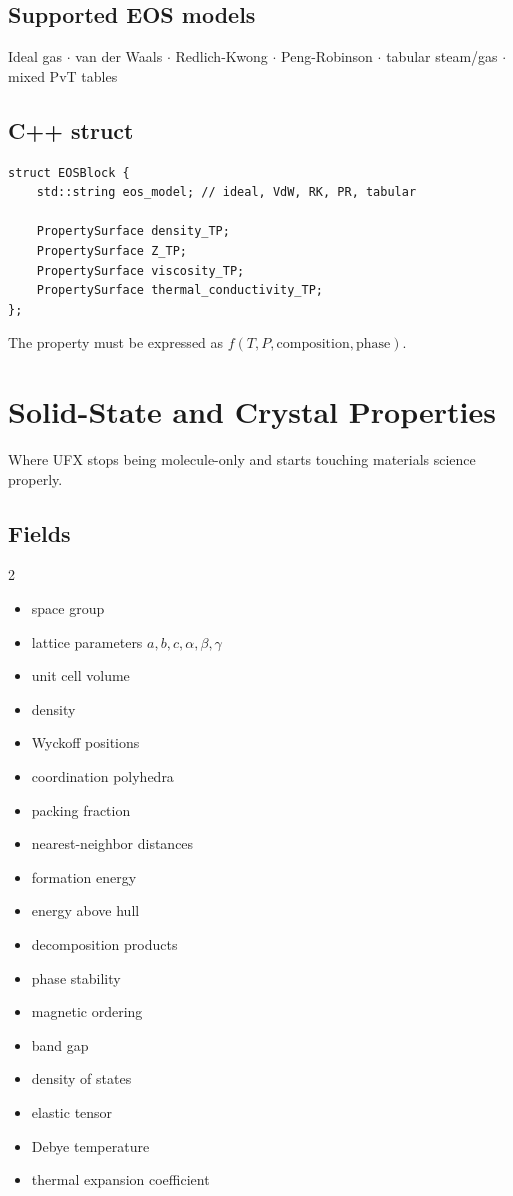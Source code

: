 \documentclass[11pt, a4paper]{article}
\begin{document}
\subsection{Supported EOS models}

Ideal gas $\cdot$ van der Waals $\cdot$ Redlich-Kwong $\cdot$ Peng-Robinson $\cdot$ tabular steam/gas $\cdot$ mixed PvT tables

\subsection{C++ struct}

\begin{lstlisting}
struct EOSBlock {
    std::string eos_model; // ideal, VdW, RK, PR, tabular

    PropertySurface density_TP;
    PropertySurface Z_TP;
    PropertySurface viscosity_TP;
    PropertySurface thermal_conductivity_TP;
};
\end{lstlisting}

The property must be expressed as $f(T, P, \text{composition}, \text{phase})$.

\section{Solid-State and Crystal Properties}

Where UFX stops being molecule-only and starts touching materials science properly.

\subsection{Fields}

\begin{multicols}{2}
\begin{itemize}[itemsep=1pt, leftmargin=*]
  \item space group
  \item lattice parameters $a, b, c, \alpha, \beta, \gamma$
  \item unit cell volume
  \item density
  \item Wyckoff positions
  \item coordination polyhedra
  \item packing fraction
  \item nearest-neighbor distances
  \item formation energy
  \item energy above hull
  \item decomposition products
  \item phase stability
  \item magnetic ordering
  \item band gap
  \item density of states
  \item elastic tensor
  \item Debye temperature
  \item thermal expansion coefficient
\end{itemize}
\end{multicols}
\end{document}
